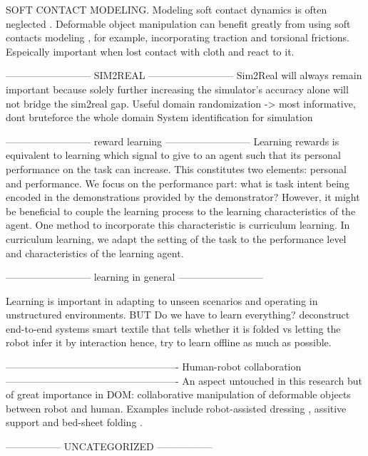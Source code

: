\documentclass[\home/main.tex]{subfiles}
\begin{document}
SOFT CONTACT MODELING. 
Modeling soft contact dynamics is often neglected \autocite{Matas2018, seita2021learning,jangir2020dynamic}. Deformable object manipulation can benefit greatly from using soft contacts modeling \autocite{Kao2004,Siciliano2008}, for example, incorporating traction and torsional frictions. Espeically important when lost contact with cloth and react to it. 

--------------------------
    SIM2REAL
--------------------------
Sim2Real will always remain important because solely further increasing the simulator's accuracy alone will not bridge the sim2real gap.
Useful domain randomization -> most informative, dont bruteforce the whole domain 
System identification for simulation 

--------------------------
    reward learning
--------------------------
Learning rewards is equivalent to learning which signal to give to an agent such that its personal performance on the task can increase. This constitutes two elements: personal and performance. We focus on the performance part: what is task intent being encoded in the demonstrations provided by the demonstrator? However, it might be beneficial to couple the learning process to the learning characteristics of the agent. One method to incorporate this characteristic is curriculum learning. In curriculum learning, we adapt the setting of the task to the performance level and characteristics of the learning agent.  

--------------------------
    learning in general
--------------------------

Learning is important in adapting to unseen scenarios and operating in unstructured environments. 
BUT
Do we have to learn everything?
    deconstruct end-to-end systems
    smart textile that tells whether it is folded vs letting the robot infer it by interaction 
        hence, try to learn offline as much as possible. 


 ----------------------------------------------------
    Human-robot collaboration
----------------------------------------------------
An aspect untouched in this research but of great importance in DOM: collaborative manipulation of deformable objects between robot and human. Examples include robot-assisted dressing \autocite{Gao2016}, assitive support \autocite{lu2017human} and bed-sheet folding \autocite{Kruse2015}.


-----------------
UNCATEGORIZED
----------------- 
\end{document}
